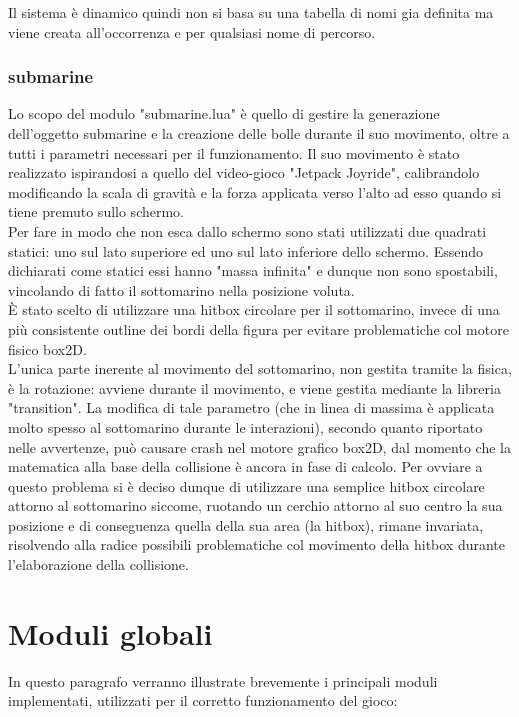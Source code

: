 \documentclass[12pt]{article}
\begin{document}
Il sistema è dinamico quindi non si basa 
su una tabella di nomi gia definita ma viene creata all’occorrenza e per qualsiasi nome di percorso.

\subsubsection{submarine}
Lo scopo del modulo "submarine.lua" è quello di gestire la generazione dell'oggetto submarine e la creazione delle bolle durante il suo movimento, oltre a tutti i parametri necessari per il funzionamento.
Il suo movimento è stato realizzato ispirandosi a quello del video-gioco "Jetpack Joyride", calibrandolo modificando la scala di gravità e la forza applicata verso l'alto ad esso quando si tiene premuto sullo schermo.\\

Per fare in modo che non esca dallo schermo sono stati utilizzati due quadrati statici: uno sul lato superiore ed uno sul lato inferiore dello schermo. Essendo dichiarati come statici essi hanno "massa infinita" e dunque non sono spostabili, vincolando di fatto il sottomarino nella posizione voluta.\\

È stato scelto di utilizzare una hitbox circolare per il sottomarino, invece di una più consistente outline dei bordi della figura per evitare problematiche col motore fisico box2D.
\\
L’unica parte inerente al movimento del sottomarino, non gestita tramite la fisica, è la rotazione: avviene durante il movimento, e viene gestita mediante la libreria "transition". La modifica di tale parametro (che in linea di massima è applicata molto spesso al sottomarino durante le interazioni), secondo quanto riportato nelle avvertenze, può causare crash nel motore grafico box2D, dal momento che la matematica alla base della collisione è ancora in fase di calcolo. Per ovviare a questo problema si è deciso dunque di utilizzare una semplice hitbox circolare attorno al sottomarino siccome, ruotando un cerchio attorno al suo centro la sua posizione e di conseguenza quella della sua area (la hitbox), rimane invariata, risolvendo alla radice possibili problematiche col movimento della hitbox durante l’elaborazione della collisione.

\section{Moduli globali}
In questo paragrafo verranno illustrate brevemente i principali moduli implementati, utilizzati per il corretto funzionamento del gioco:
\\
\end{document}
